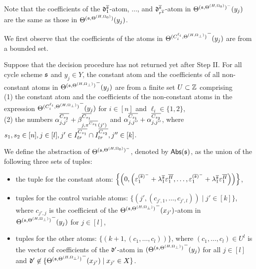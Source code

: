 Note that the coefficients of the $\mathfrak{d}^{\overline{{\mathfrak{s} }}}_1$-atom, $\dots$, and $\mathfrak{d}^{\overline{{\mathfrak{s} }}}_{r^{\overline{{\mathfrak{s} }}}}$-atom in $\Theta^{({\mathfrak{s} },\Theta^{(H,\Omega_0)})^-}(y_j)$ are the same as those in $\Theta^{({\mathfrak{s} },\Theta^{(H,\Omega_0)})}(y_j)$.

We first observe that the coefficients of the atoms in ${\Theta^{(C^{\ell_i}_{i}, \Theta^{(H,\Omega_\bot)})}}^-(y_j)$ are from a bounded set.
%
\begin{lemma}\label{prop-bnd-domain-2}
	Suppose that the decision procedure has not returned yet after Step II. 
	For all cycle scheme ${\mathfrak{s} }$ and $y_j \in Y$, the constant atom and the coefficients of all non-constant atoms in ${\Theta^{({\mathfrak{s} }, \Theta^{(H,\Omega_\bot)})}}^-(y_j)$ are from a finite set $U \subset {\mathbb{Z} }$ comprising \\ (1)
	the constant atom and the coefficients of the non-constant atoms in the expression ${\Theta^{(C^{\ell_i}_{i}, \Theta^{(H,\Omega_\bot)})}}^-(y_j)$ for $i\in [n]$ and $\ell_i \in \{1,2\}$,\smallskip\\(2) the numbers $\alpha^{\overline{C_{s_2}}}_{j,j'} + \beta^{\overline{C_{s_1}}}_{j,\pi^{\overline{C_{s_1}}}(j')}$ and $\alpha^{\overline{C_{s_1}}}_{j, j''} + \alpha^{\overline{C_{s_2}}}_{j,j''}$, where  $s_1,s_2 \in [n], j\in[l],j' \in I^{\overline{C_{s_1}}}_{tr} \cap I^{\overline{C_{s_2}}}_{tr},  j'' \in [k]$. 
\end{lemma}


We define the abstraction of $\Theta^{({\mathfrak{s} },\Theta^{(H,\Omega_0)})^-}$, denoted by $\mathsf{Abs}({\mathfrak{s} })$, as the union of the following three sets of tuples:
\begin{itemize}
\item the tuple for the constant atom: $\left\{\left(0, \left( \varepsilon^{(\overline{{\mathfrak{s} }})^-}_{1}+ \lambda^{\overline{{\mathfrak{s} }}}_{1} \varepsilon^{\overline{H}}_{1},\dots, \varepsilon^{(\overline{{\mathfrak{s} }})^-}_{1}+ \lambda^{\overline{{\mathfrak{s} }}}_{1} \varepsilon^{\overline{H}}_{1} \right) \right)\right\}$,
% 
\item tuples for the control variable atoms: $\{(j', (c_{j',1},\dots, c_{j', l})) \mid j' \in [k]\}$, where $c_{j', j}$ is the coefficient of the ${\Theta^{({\mathfrak{s} },\Theta^{(H,\Omega_\bot)})}}^-(x_{j'})$-atom in ${\Theta^{({\mathfrak{s} },\Theta^{(H,\Omega_\bot)})}}^-(y_{j})$ for $j\in[l]$,
% 
\item tuples for the other atoms: $\{(k+1, (c_1,\dots,c_l))\}$, where $(c_1,\dots,c_l) \in U^l$ is the vector of coefficients of the $\mathfrak{d}'$-atom in ${(\Theta^{({\mathfrak{s} },\Theta^{(H,\Omega_\bot)})}}^-(y_{j})$ for all $j \in [l]$ and $\mathfrak{d}'\not\in \{{\Theta^{({\mathfrak{s} },\Theta^{(H,\Omega_\bot)})}}^-(x_{j'})\mid x_{j'}\in X\}$.
\end{itemize}

